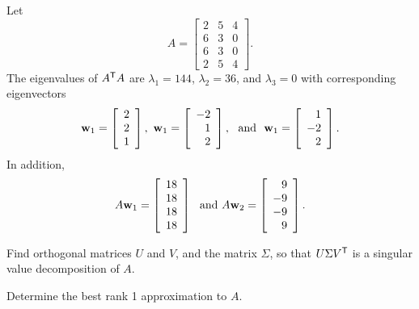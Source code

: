 \begin{example} Let
\[A = \left[ \begin{array}{ccc} 2&5&4\\6&3&0\\6&3&0\\2&5&4 \end{array} \right].\]
The eigenvalues of $A^{\tr}A$ are $\lambda_1 = 144$, $\lambda_2 = 36$, and $\lambda_3=0$ with corresponding eigenvectors
\[\vw_1 = \left[ \begin{array}{c} 2\\2\\1 \end{array} \right], \ \vw_1 = \left[ \begin{array}{r} -2\\1\\2 \end{array} \right], \ \text{ and } \ \vw_1 = \left[ \begin{array}{r} 1\\-2\\2 \end{array} \right].\]
In addition,
\[A \vw_1 = \left[ \begin{array}{c} 18\\18\\18\\18 \end{array} \right] \ \text{ and } A \vw_2 = \left[ \begin{array}{r} 9\\-9\\-9\\9 \end{array} \right].\]
    \ba

    \item Find orthogonal matrices $U$ and $V$, and the matrix $\Sigma$, so that $U \Sigma V^{\tr}$ is a singular value decomposition of $A$.

    \item Determine the best rank 1 approximation to $A$. 
    
    \ea


\ExampleSolution


\end{example}
